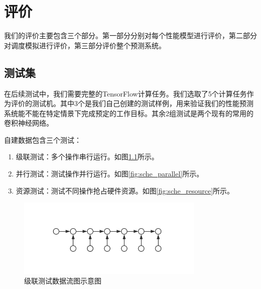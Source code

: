 \chapter{评价}
\label{cha:eval}
    我们的评价主要包含三个部分。第一部分分别对每个性能模型进行评价，第二部分对调度模拟进行评价，第三部分评价整个预测系统。

\section{测试集}
    在后续测试中，我们需要完整的TensorFlow计算任务。我们选取了5个计算任务作为评价的测试机。其中3个是我们自己创建的测试样例，用来验证我们的性能预测系统能不能在特定情景下完成预定的工作目标。其余2组测试是两个现有的常用的卷积神经网络。

    自建数据包含三个测试：
    
    \begin{enumerate}
        \item 级联测试：多个操作串行运行。如图\ref{fig:sche_cascade}所示。
        \item 并行测试：测试操作并行运行。如图\ref{fig:sche_parallel}所示。
        \item 资源测试：测试不同操作抢占硬件资源。如图\ref{fig:sche_resource}所示。
    \end{enumerate}

    \begin{figure}[!htbp]
        \centering
        \includegraphics[width=0.8\textwidth]{figures/sche_cascade.jpg}
        \caption{级联测试数据流图示意图}
        \label{fig:sche_cascade}
    \end{figure}

